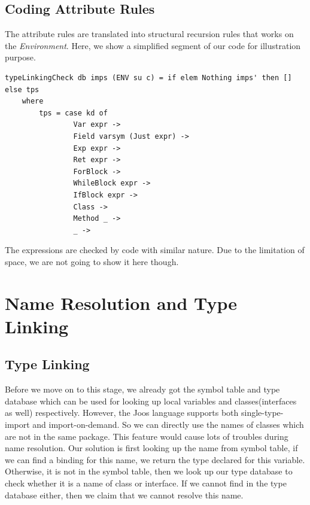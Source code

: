 \documentclass[12pt,letterpaper]{article}
\begin{document}
\subsection{Coding Attribute Rules}
The attribute rules are translated into structural recursion rules that works on the \emph{Environment}. Here, we show a simplified segment of our code for illustration purpose.
\begin{lstlisting}
typeLinkingCheck db imps (ENV su c) = if elem Nothing imps' then [] else tps
    where
        tps = case kd of
                Var expr ->
                Field varsym (Just expr) -> 
                Exp expr ->                
                Ret expr ->
                ForBlock ->
                WhileBlock expr ->
                IfBlock expr ->
                Class ->
                Method _ ->
                _ -> 
\end{lstlisting}

The expressions are checked by code with similar nature. Due to the limitation of space, we are not going to show it here though.

\section{Name Resolution and Type Linking}
\subsection{Type Linking}

Before we move on to this stage, we already got the symbol table and type database which can be used for looking up local variables and classes(interfaces as well) respectively.
However, the Joos language supports both single-type-import and import-on-demand.
So we can directly use the names of classes which are not in the same package.
This feature would cause lots of troubles during name resolution.
Our solution is first looking up the name from symbol table, if we can find a binding for this name, we return the type declared for this variable.
Otherwise, it is not in the symbol table, then we look up our type database to check whether it is a name of class or interface.
If we cannot find in the type database either, then we claim that we cannot resolve this name.

\end{document}
